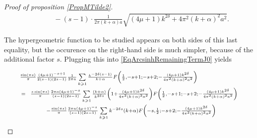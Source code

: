 \documentclass{jams-l}
\theoremstyle{definition}
\theoremstyle{remark}
\numberwithin{equation}{section}
\begin{document}
\begin{proof}[Proof of proposition \ref{PropMTilde2}]
\[\begin{array}{lll}
                                && \qquad \scriptstyle - \left( s-1 \right) \cdot \frac{1}{2 \pi \left( k + \alpha \right) a} \sqrt{\left( 4 \mu + 1 \right) k^{2 \delta} + 4 \pi^2 \left( k + \alpha \right)^2 a^2}.
                            \end{array} \]
                        
                        \noindent The hypergeometric function to be studied appears on both sides of this last equality, but the occurence on the right-hand side is much simpler, because of the additional factor $s$. Plugging this into \eqref{EqArcsinhRemainingTermJ0} yields
                        
                        \begin{equation}
                        \label{EqMTildePart2J0Contiguous}
                            \begin{array}{ll}
                                \multicolumn{2}{l}{\scriptstyle \frac{\sin \left( \pi s \right)}{\pi} \frac{\left( 4 \mu + 1 \right)^{-s+1}}{2 \left( s-1 \right) \left( 2s-1 \right)} \frac{1}{2 \pi a} \sum\limits_{k \geqslant 1} \frac{k^{-2\delta \left( s - 1 \right)}}{k + \alpha} F \left( \frac{1}{2}, -s+1; -s+2;  - \frac{\left( 4  \mu + 1 \right) k^{2 \delta}}{4 \pi^2 \left( k + \alpha \right)^2 a^2} \right)} \\[1em]
                                
                                \hspace{2pt} \scriptstyle = & \hspace{-3pt} \scriptstyle \frac{s \sin \left( \pi s \right)}{\pi} \frac{2 \pi a \left( 4 \mu + 1 \right)^{-s}}{\left( s-1 \right) \left( 2s-1 \right)} \sum\limits_{k \geqslant 1} \frac{\left( k + \alpha \right)}{k^{2 \delta s}} \left( 1 + \frac{\left( 4 \mu + 1 \right) k^{2 \delta}}{4 \pi^2 \left( k + \alpha \right)^2 a^2} \right) F \left( \frac{1}{2}, -s+1; -s+2; - \frac{\left( 4 \mu + 1 \right) k^{2 \delta}}{4 \pi^2 \left( k + \alpha \right)^2 a^2} \right) \\[1em]
                                
                                & \scriptstyle \qquad - \frac{\sin \left( \pi s \right)}{\pi} \frac{2 \pi a \left( 4 \mu + 1 \right)^{-s}}{\left( s-1 \right) \left( 2s-1 \right)} \sum\limits_{k \geqslant 1} k^{- 2 \delta s} \left( k + \alpha \right) F \left( -s, \frac{1}{2}; -s+2; - \frac{\left( 4 \mu + 1 \right) k^{2 \delta}}{4 \pi^2 \left( k + \alpha \right)^2 a^2} \right) \\[1em]
                                

\end{array}
\end{equation}
\end{proof}
\end{document}
